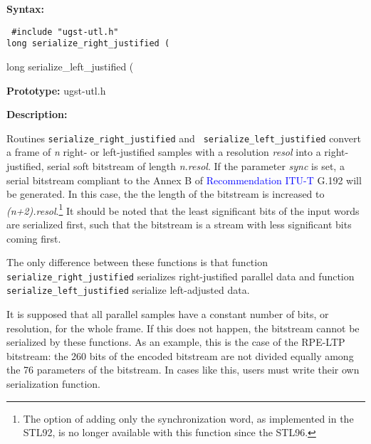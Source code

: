 {\bf Syntax: }

{\tt
\#include "ugst-utl.h"\\
long serialize\_right\_justified \hfill
         (

long serialize\_left\_justified \hfill
         (
}

{\bf Prototype: }    ugst-utl.h

{\bf Description: }

Routines {\tt serialize\_right\_justified} and {\tt
serialize\_left\_justified} convert a frame of {\em n} right- or
left-justified samples with a resolution {\em resol} into a
right-justified, serial soft bitstream of length {\em n.resol}.  If
the parameter {\em sync} is set, a serial bitstream compliant to the
Annex B of \textcolor{blue}{Recommendation ITU-T} G.192 will be generated.  In this
case, the the length of the bitstream is increased to {\em
(n+2).resol}.\footnote{\SF The option of adding only the
synchronization word, as implemented in the STL92, is no longer
available with this function since the STL96.}  It should be noted
that the least significant bits of the input words are serialized
first, such that the bitstream is a stream with less significant bits
coming first.

The only difference between these functions is
that function {\tt serialize\_right\_justified} serializes
right-justified parallel data and function {\tt
serialize\_left\_justified} serialize left-adjusted data.

It is supposed that all parallel samples have a
constant number of bits, or resolution, for the whole frame. If this
does not happen, the bitstream cannot be serialized by these
functions. As an example, this is the case of the RPE-LTP bitstream:
the 260 bits of the encoded bitstream are not divided equally among
the 76 parameters of the bitstream. In cases like this, users must
write their own serialization function.


